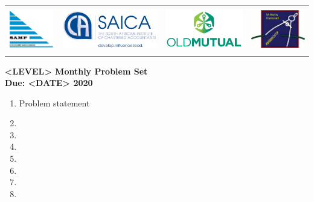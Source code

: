 \documentclass{article}
\begin{document}
\setlength{\tabcolsep}{6pt}
\begin{center} \begin{tabular}{cccc}
	\includegraphics[height=56pt]{SAMF_logo.jpg} &
	\includegraphics[height=56pt]{SAICA_logo.jpg} &
	\includegraphics[height=56pt]{OM_Logo_Stacked_Vignette_on_White_RGB.jpg} &
	\includegraphics[height=56pt]{SAMO2019.png}
\end{tabular} \end{center}


\bigskip


\begin{center}
\textbf{\Large <LEVEL> Monthly Problem Set}
\\ \vspace{1em}
\textbf{\large Due: <DATE> 2020}
\end{center}

\begin{enumerate}

\medskip
\item %
Problem statement


\medskip
\item


\medskip
\item


\medskip
\item


\medskip
\item


\medskip
\item


\medskip
\item


\medskip
\item


\end{enumerate}
\end{document}
